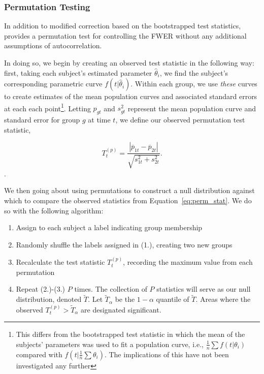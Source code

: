 \subsubsection{Permutation Testing}

In addition to modified correction based on the bootstrapped test statistics,  provides a permutation test for controlling the FWER without any additional assumptions of autocorrelation. 

In doing so, we begin by creating an observed test statistic in the following way: first, taking each subject's estimated parameter $\hat{\theta}_i$, we find the subject's corresponding parametric curve $f(t|\hat{\theta}_i)$. Within each group, we use \textit{these} curves to create estimates of the mean population curves and associated standard errors at each each point\footnote{This differs from the bootstrapped test statistic in which the mean of the subjects' parameters was used to fit a population curve, i.e., $\frac1n \sum f(t|\theta_i)$ compared with $f \left( t | \frac1n \sum \theta_i \right)$. The implications of this have not been investigated any further}. Letting $p_{gt}$ and $s_{gt}^2$ represent the mean population curve and standard error for group $g$ at time $t$, we define our observed permutation test statistic, 

\begin{equation}\label{eq:perm_stat}
T_t^{(p)} = \frac{|\overline{p}_{1t} - \overline{p}_{2t}|}{\sqrt{s_{1t}^2 + s_{2t}^2}}.
\end{equation}.

We then going about using permutations to construct a null distribution against which to compare the observed statistics from Equation~\ref{eq:perm_stat}. We do so with the following algorithm:

\begin{enumerate}
\item Assign to each subject a label indicating group membership
\item Randomly shuffle the labels assigned in (1.), creating two new groups 
\item Recalculate the test statistic $T^{(p)}_t$, recording the maximum value from each permutation
\item Repeat (2.)-(3.) $P$ times. The collection of $P$ statistics will serve as our null distribution, denoted $\widetilde{T}$. Let $\widetilde{T}_{\alpha}$ be the $1 - \alpha$ quantile of $\widetilde{T}$. Areas where the observed $T^{(p)}_t > \widetilde{T}_{\alpha}$ are designated significant.
\end{enumerate}

